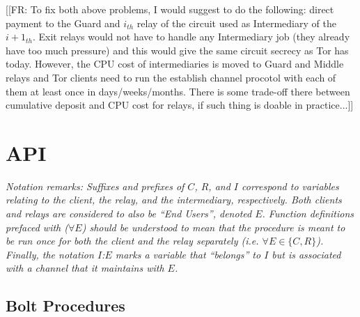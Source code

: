 \documentclass{article}
\newcommand{\flo}[1]{ {\color{red} [[FR: #1]]}}
\begin{document}
\flo{To fix both above problems, I would suggest to do the following: direct payment to the Guard and $i_{th}$ relay of the circuit used as Intermediary of the $i+1_{th}$. Exit relays would not have to handle any Intermediary job (they already have too much pressure) and this would give the same circuit secrecy as Tor has today. However, the CPU cost of intermediaries is moved to Guard and Middle relays and Tor clients need to run the establish channel procotol with each of them at least once in days/weeks/months. There is some trade-off there between cumulative deposit and CPU cost for relays, if such thing is doable in practice...}

\section{API}

\textit{Notation remarks: Suffixes and prefixes of $C$, $R$, and $I$ correspond to variables relating to the client, the relay, and the intermediary, respectively. Both clients and relays are considered to also be ``End Users'', denoted $E$. Function definitions prefaced with ($\forall E$) should be understood to mean that the procedure is meant to be run once for both the client and the relay separately (i.e. $\forall E \in \{C, R\}$). Finally, the notation $I$:$E$ marks a variable that ``belongs'' to $I$ but is associated with a channel that it maintains with $E$.}

\subsection{Bolt Procedures}
\end{document}
